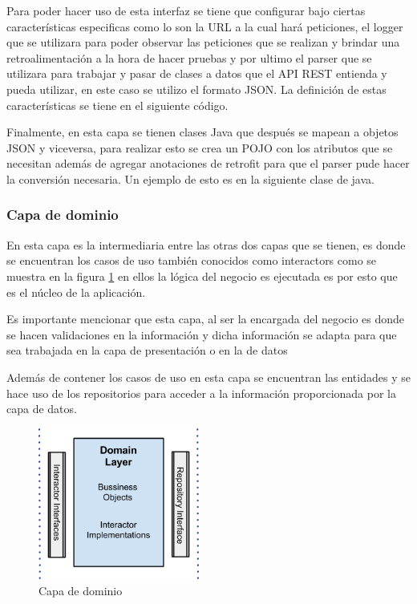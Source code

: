 

Para poder hacer uso de esta interfaz se tiene que configurar bajo ciertas caracterí­sticas especificas como lo son la URL a la cual hará peticiones, el logger que se utilizara para poder observar las peticiones que se realizan y brindar una retroalimentación a la hora de hacer pruebas y por ultimo el parser que se utilizara para trabajar y pasar de clases a datos que el API REST entienda y pueda utilizar, en este caso se utilizo el formato JSON. La definición de estas características se tiene en el siguiente código.



Finalmente, en esta capa se tienen clases Java que después se mapean a objetos JSON y viceversa, para realizar esto se crea un POJO con los atributos que se necesitan además de agregar anotaciones de retrofit para que el parser pude hacer la conversión necesaria. Un ejemplo de esto es en la siguiente clase de java.




\subsubsection{Capa de dominio}
En esta capa es la intermediaria entre las otras dos capas que se tienen, es donde se encuentran los casos de uso también conocidos como interactors como se muestra en la figura \ref{fig:capa-dominio} en ellos la lógica del negocio es ejecutada es por esto que es el núcleo de la aplicación.

Es importante mencionar que esta capa, al ser la encargada del negocio es donde se hacen validaciones en la información y dicha información se adapta para que sea trabajada en la capa de presentación o en la de datos

Además de contener los casos de uso en esta capa se encuentran las entidades y se hace uso de los repositorios para acceder a la información proporcionada por la capa de datos.

\begin{figure}[h]
    \centering
    \includegraphics[width=200px]{capitulo5/android/img/capa-dominio.png}
    \caption{Capa de dominio \cite{cleanWay}}
    \label{fig:capa-dominio}
\end{figure}

